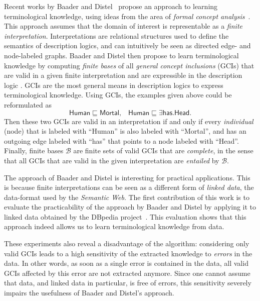 \documentclass[english,fleqn]{scrartcl}
\begin{document}
Recent works by Baader and Distel~\cite{Diss-Felix} propose an approach to learning
terminological knowledge, using ideas from the area of \emph{formal concept
  analysis}~\cite{fca-book}.  This approach assumes that the domain of interest is
representable as a \emph{finite interpretation}.  Interpretations are relational
structures used to define the semantics of description logics, and can intuitively be seen
as directed edge- and node-labeled graphs.  Baader and Distel then propose to learn
terminological knowledge by computing \emph{finite bases} of all \emph{general concept
  inclusions} (GCIs) that are valid in a given finite interpretation and are expressible
in the description logic \ELbot.  GCIs are the most general means in description logics to
express terminological knowledge.  Using GCIs, the examples given above could be
reformulated as
\begin{equation*}
  \mathsf{Human} \sqsubseteq \mathsf{Mortal}, \;\;\; \mathsf{Human} \sqsubseteq \exists
  \mathsf{has}. \mathsf{Head}.
\end{equation*}
Then these two GCIs are valid in an interpretation if and only if every \emph{individual}
(node) that is labeled with \enquote{\textsf{Human}} is also labeled with
\enquote{\textsf{Mortal}}, and has an outgoing edge labeled with \enquote{\textsf{has}}
that points to a node labeled with \enquote{\textsf{Head}}.  Finally, finite bases
$\mathcal{B}$ are finite sets of valid GCIs that are \emph{complete}, in the sense that
all GCIs that are valid in the given interpretation are \emph{entailed} by $\mathcal{B}$.

The approach of Baader and Distel is interesting for practical applications.  This is
because finite interpretations can be seen as a different form of \emph{linked data}, the
data-format used by the \emph{Semantic Web}.  The first contribution of this work is to
evaluate the practicability of the approach by Baader and Distel by applying it to linked
data obtained by the DBpedia project~\cite{DBpedia}.  This evaluation shows that this
approach indeed allows us to learn terminological knowledge from data.

These experiments also reveal a disadvantage of the algorithm: considering only valid GCIs
leads to a high sensitivity of the extracted knowledge to \emph{errors} in the data.  In
other words, as soon as a single error is contained in the data, all valid GCIs affected
by this error are not extracted anymore.  Since one cannot assume that data, and linked
data in particular, is free of errors, this sensitivity severely impairs the usefulness of
Baader and Distel's approach.
\end{document}
